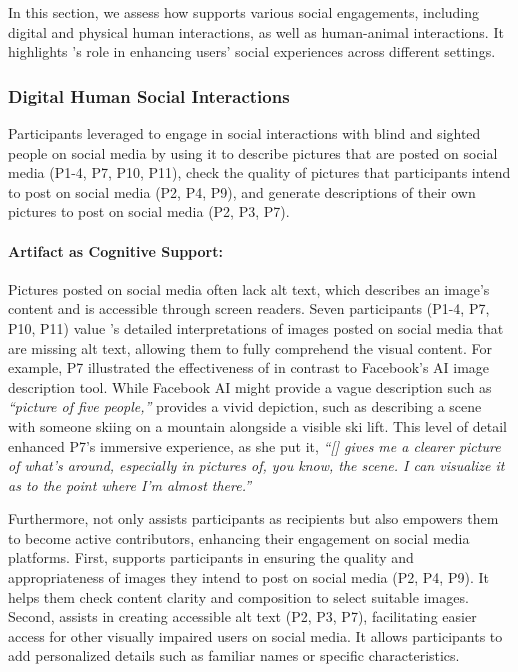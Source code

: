 In this section, we assess how \bma{} supports various social engagements, including digital and physical human interactions, as well as human-animal interactions. It highlights \bma's role in enhancing users' social experiences across different settings.



\subsubsection{Digital Human Social Interactions}
\label{digital}

Participants leveraged \bma{} to engage in social interactions with blind and sighted people on social media by using it to describe pictures that are posted on social media (P1-4, P7, P10, P11), check the quality of pictures that participants intend to post on social media (P2, P4, P9), and generate descriptions of their own pictures to post on social media (P2, P3, P7).



\paragraph{Artifact as Cognitive Support:}
Pictures posted on social media often lack alt text, which describes an image's content and is accessible through screen readers.
% 
Seven participants (P1-4, P7, P10, P11) value \bma's detailed interpretations of images posted on social media that are missing alt text, allowing them to fully comprehend the visual content. For example, P7 illustrated the effectiveness of \bma{} in contrast to Facebook's AI image description tool. 
% 
While Facebook AI might provide a vague description such as \textit{``picture of five people,''} \bma{} provides a vivid depiction, such as describing a scene with someone skiing on a mountain alongside a visible ski lift. 
This level of detail enhanced P7's immersive experience, 
as she put it, \textit{``[\bma] gives me a clearer picture of what's around, especially in pictures of, you know, the scene. I can visualize it as to the point where I'm almost there.''}





Furthermore, \bma{} not only assists participants as recipients but also empowers them to become active contributors, enhancing their engagement on social media platforms. First, \bma{} supports participants in ensuring the quality and appropriateness of images they intend to post on social media (P2, P4, P9). It helps them check content clarity and composition to select suitable images. 
% 
Second, \bma{} assists in creating accessible alt text (P2, P3, P7), facilitating easier access for other visually impaired users on social media. 
It allows participants to add personalized details such as familiar names or specific characteristics. 




